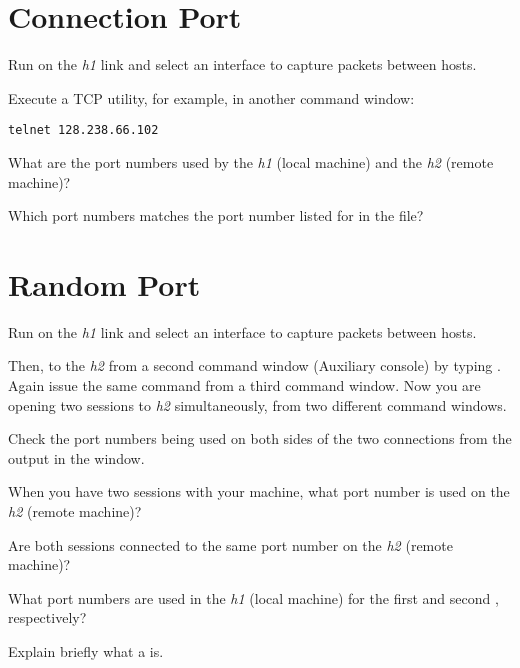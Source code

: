 \documentclass{../UTNetLab}
\begin{document}
\section{Connection Port}
    Run  on the \textit{h1} link and select an interface to capture packets between hosts.

    Execute a TCP utility,  for example, in another command window:
    \begin{lstlisting}
telnet 128.238.66.102
    \end{lstlisting}
    
    \begin{report}
        \item What are the port numbers used by the \textit{h1} (local machine) and the \textit{h2} (remote machine)?

        \item Which port numbers matches the port number listed for  in the  file?
    \end{report}

\section{Random Port}
    Run  on the \textit{h1} link and select an interface to capture packets between hosts.

    Then,  to the \textit{h2} from a second command window (Auxiliary console) by typing .
    Again issue the same  command from a third command window.
    Now you are opening two  sessions to \textit{h2} simultaneously, from two different command windows.

    Check the port numbers being used on both sides of the two connections from the output in the  window.

    \begin{report}
        \item When you have two  sessions with your machine, what port number is used on the \textit{h2} (remote machine)?

        \item Are both sessions connected to the same port number on the \textit{h2} (remote machine)?

        \item What port numbers are used in the \textit{h1} (local machine) for the first and second , respectively?

        \item Explain briefly what a  is.
    \end{report}
\end{document}
